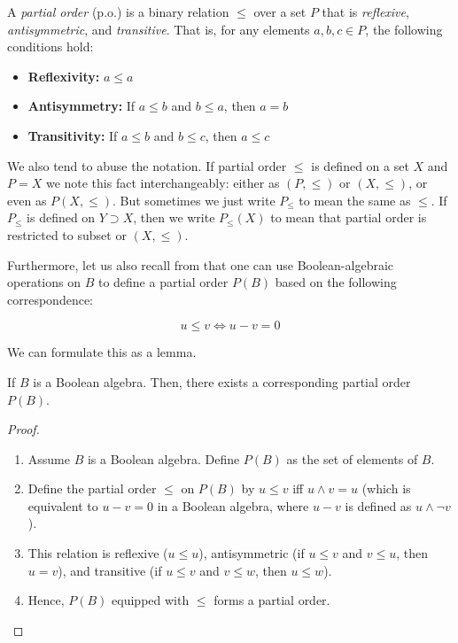 \begin{definition}\label{def_po}
  A \textit{partial order} (p.o.) is a binary relation $\leq$ over a set $P$ that is \textit{reflexive}, \textit{antisymmetric}, and \textit{transitive}. That is, for any elements $a, b, c \in P$, the following conditions hold:
  \begin{itemize}
      \item \textbf{Reflexivity:} $a \leq a$
      \item \textbf{Antisymmetry:} If $a \leq b$ and $b \leq a$, then $a = b$
      \item \textbf{Transitivity:} If $a \leq b$ and $b \leq c$, then $a \leq c$
  \end{itemize}
\end{definition}

We also tend to abuse the notation. If partial order $\leq$ is defined on a set $X$ and $P = X$ we note this fact interchangeably: either as $(P,\leq)$ or $(X,\leq)$, or even as $P(X,\leq)$. But sometimes we just write $P_{\leq}$ to mean the same as $\leq$. If $P_{\leq}$ is defined on $Y \supset X$, then we write $P_{\leq}(X)$ to mean that partial order is restricted to subset or $(X, \leq)$.

Furthermore, let us also recall from \cite{jech2003set} that one can use Boolean-algebraic operations on $B$ to define a partial order $P(B)$ based on the following correspondence:

\[ u \leq v \Leftrightarrow u - v = 0 \]

We can formulate this as a lemma.

\begin{lemma}\label{lemma_eq_po_ba}
  If $B$ is a Boolean algebra. Then, there exists a corresponding partial order $P(B)$. 
\end{lemma}
\begin{proof}
  \begin{enumerate}
  \item Assume $B$ is a Boolean algebra. Define $P(B)$ as the set of elements of $B$.
  \item Define the partial order $\leq$ on $P(B)$ by $u \leq v$ iff $u \land v = u$ (which is equivalent to $u - v = 0$ in a Boolean algebra, where $u - v$ is defined as $u \land \neg v$).
  \item This relation is reflexive ($u \leq u$), antisymmetric (if $u \leq v$ and $v \leq u$, then $u = v$), and transitive (if $u \leq v$ and $v \leq w$, then $u \leq w$).
  \item Hence, $P(B)$ equipped with $\leq$ forms a partial order.
  \end{enumerate}
\end{proof}

